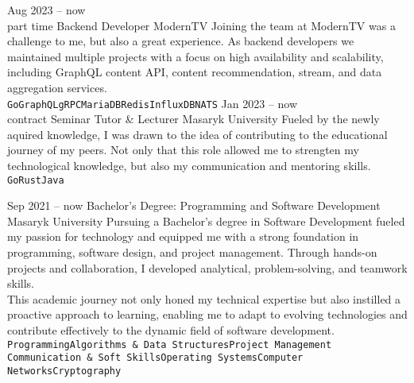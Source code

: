 \documentclass[9pt]{cv}
\begin{document}
\begin{center}
\end{center}


\begin{entrylist}
	\entry
		{Aug 2023 -- now\\\footnotesize{part time}}
		{Backend Developer}
		{ModernTV}
		{Joining the team at ModernTV was a challenge to me, but also a great experience. As backend developers we maintained multiple projects with a focus on high availability and scalability, including GraphQL content API, content recommendation, stream, and data aggregation services.\\ \texttt{Go}\slashsep\texttt{GraphQL}\slashsep\texttt{gRPC}\slashsep\texttt{MariaDB}\slashsep\texttt{Redis}\slashsep\texttt{InfluxDB}\slashsep\texttt{NATS}}
	\entry
		{Jan 2023 -- now\\\footnotesize{contract}}
        {Seminar Tutor \& Lecturer}
		{Masaryk University}
		{Fueled by the newly aquired knowledge, I was drawn to the idea of contributing to the educational journey of my peers. Not only that this role allowed me to strengten my technological knowledge, but also my communication and mentoring skills.\\ \texttt{Go}\slashsep\texttt{Rust}\slashsep\texttt{Java}}
\end{entrylist}


\begin{entrylist}
	\entry
		{Sep 2021 -- now}
		{Bachelor's Degree: Programming and Software Development}
		{Masaryk University}
        {Pursuing a Bachelor's degree in Software Development fueled my passion for technology and equipped me with a strong foundation in programming, software design, and project management. Through hands-on projects and collaboration, I developed analytical, problem-solving, and teamwork skills.\\ This academic journey not only honed my technical expertise but also instilled a proactive approach to learning, enabling me to adapt to evolving technologies and contribute effectively to the dynamic field of software development.\\ \texttt{Programming}\slashsep\texttt{Algorithms \& Data Structures}\slashsep\texttt{Project Management}\slashsep\\ \texttt{Communication \& Soft Skills}\slashsep\texttt{Operating Systems}\slashsep\texttt{Computer Networks}\slashsep\texttt{Cryptography}}
\end{entrylist}
\end{document}

